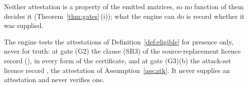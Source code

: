 
Neither attestation is a property of the emitted matrices, so no function of
them decides it (Theorem~\ref{thm:gates}\,(i)); what the engine can do is
record whether it was supplied.

\begin{requirement}\label{req:attestation-presence}
The engine tests the attestations of Definition~\ref{def:eligible} for
presence only, never for truth: at gate (G2) the clause (SR3) of the
source-replacement licence record 
(), in every form of the certificate, and at gate
(G3)(b) the attack-set licence record , the
attestation of Assumption~\ref{ass:atk}. It never supplies an attestation and
never verifies one.
\end{requirement}
